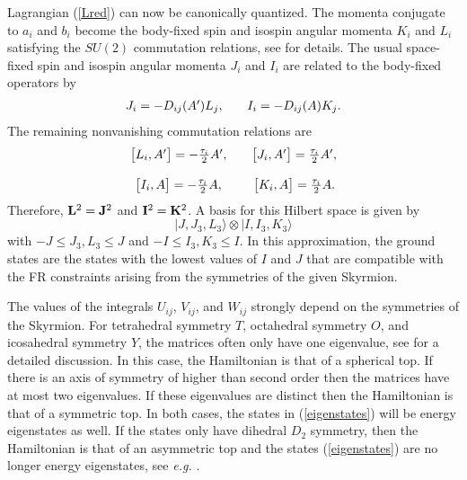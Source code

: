 \documentclass[a4paper,12pt]{article}
\begin{document}
Lagrangian (\ref{Lred}) can now be canonically quantized. 
The momenta
conjugate to $a_i$ and $b_i$ become the body-fixed spin and isospin
angular momenta $K_i$ and $L_i$ satisfying the $SU(2)$ commutation
relations, see \cite{Braaten:1988cc} for details. 
The usual space-fixed spin and isospin angular momenta
$J_i$  and $I_i$ are related to the body-fixed operators by
%
\begin{equation}
\begin{array}{c c c}
J_i = - D_{ij} (A^\prime) L_j, & & I_i = - D_{ij} (A) K_j.
\end{array}
\end{equation} 
%
The remaining nonvanishing commutation relations are
%
\begin{equation}
\begin{array}{c c c}
\big[L_i,A^\prime \big]  = - \frac{\tau_i}{2} A^\prime, & &
\big[
J_i,A^\prime \big]  = \frac{\tau_i}{2} A^\prime, \\ \\ \big[I_i,A
\big]  = - \frac{\tau_i}{2} A, & & \big[K_i,A \big]  =
\frac{\tau_i}{2} A.
\end{array}
\end{equation}
%
Therefore, ${\bf L}^2 = {\bf J}^2$ and ${\bf I}^2 = {\bf K}^2$.  A
basis for this Hilbert space is given by
%
\begin{equation}
\label{eigenstates}
|J,J_3,L_3\rangle \otimes |I,I_3, K_3 \rangle
\end{equation}
%
with $-J \le J_3, L_3 \le J$ and $-I \le I_3, K_3 \le I$. 
In this approximation, the ground
states are the states with the lowest values of $I$ and $J$ that are
compatible with the FR constraints arising from the symmetries of the
given Skyrmion.

The values of the integrals $U_{ij}$, $V_{ij}$, and $W_{ij}$ strongly 
depend on the symmetries of the Skyrmion. For tetrahedral symmetry $T$,
octahedral symmetry $O$, and icosahedral symmetry $Y$, the matrices often
only have one eigenvalue, see \cite{Irwin:1998bs} 
for a detailed discussion. In this case, the Hamiltonian is that of a 
spherical top. If there is an axis of symmetry of higher than second order 
then the matrices have at most two eigenvalues. If these eigenvalues 
are distinct then the Hamiltonian is that of a symmetric top. In both 
cases, the states in (\ref{eigenstates}) will be energy eigenstates as 
well. If the states only have dihedral $D_2$ symmetry, then the 
Hamiltonian is that of an asymmetric top and the states
(\ref{eigenstates}) are no longer energy eigenstates, see {\it e.g.}
\cite{Landau:1977}.
\end{document}
